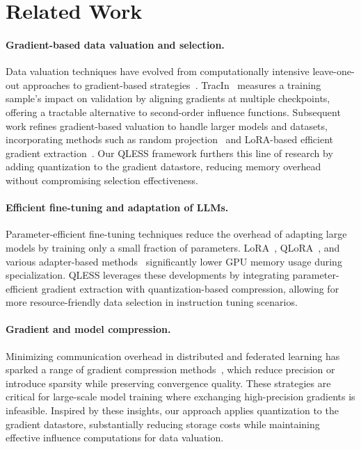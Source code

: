 \section{Related Work}
\label{sec:related_work}

\paragraph{Gradient-based data valuation and selection.}
Data valuation techniques have evolved from computationally intensive leave-one-out approaches to gradient-based strategies~\cite{influence}. TracIn~\cite{tracin} measures a training sample’s impact on validation by aligning gradients at multiple checkpoints, offering a tractable alternative to second-order influence functions. Subsequent work refines gradient-based valuation to handle larger models and datasets, incorporating methods such as random projection~\cite{trak,less} and LoRA-based efficient gradient extraction~\cite{loGra,DataInf,less}. Our QLESS framework furthers this line of research by adding quantization to the gradient datastore, reducing memory overhead without compromising selection effectiveness.

\paragraph{Efficient fine-tuning and adaptation of LLMs.}
Parameter-efficient fine-tuning techniques reduce the overhead of adapting large models by training only a small fraction of parameters. LoRA~\cite{LoRA}, QLoRA~\cite{QLoRa}, and various adapter-based methods~\cite{AdaLoRA,LoHa,LoKr,OFT,BOFT} significantly lower GPU memory usage during specialization. QLESS leverages these developments by integrating parameter-efficient gradient extraction with quantization-based compression, allowing for more resource-friendly data selection in instruction tuning scenarios.

\paragraph{Gradient and model compression.}
Minimizing communication overhead in distributed and federated learning has sparked a range of gradient compression methods~\cite{Grad8bit,SignSGD,TernGrad,QSGD,SparseGD1,SparseGD2,SparseGD3}, which reduce precision or introduce sparsity while preserving convergence quality. These strategies are critical for large-scale model training where exchanging high-precision gradients is infeasible. Inspired by these insights, our approach applies quantization to the gradient datastore, substantially reducing storage costs while maintaining effective influence computations for data valuation.

